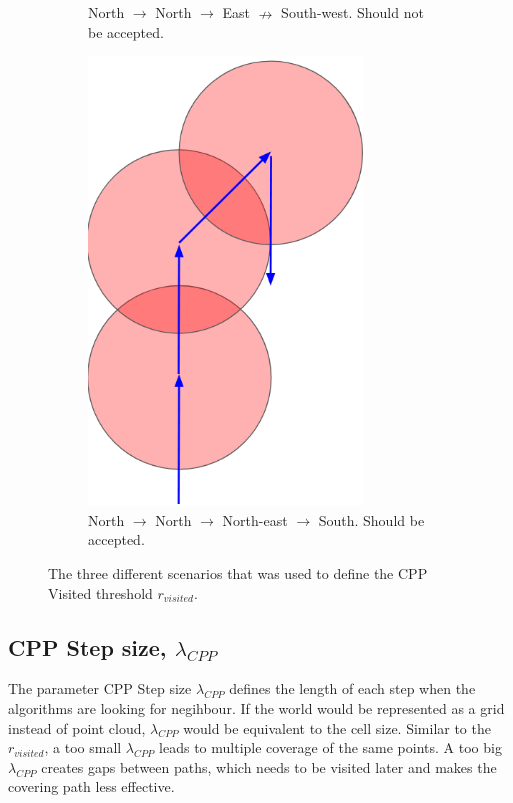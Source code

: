 \begin{figure}
\begin{subfigure}{0.3\textwidth}
    \caption{North $\rightarrow$ North $\rightarrow$ East $\nrightarrow$ South-west. Should not be accepted.}
    \label{fig:threshold_b}
    \end{subfigure}
    \begin{subfigure}{0.3\textwidth}
    \centering
    \includegraphics[width=0.8\textwidth]{figures/threshold_c.png}
    \caption{North $\rightarrow$ North $\rightarrow$ North-east $\rightarrow$ South. Should be accepted.}
    \label{fig:threshold_c}
    \end{subfigure}
    \caption{The three different scenarios that was used to define the CPP Visited threshold $r_{visited}$.}
    \label{fig:threshold}
\end{figure}

\subsection{CPP Step size, $\lambda_{CPP}$}
The parameter CPP Step size $\lambda_{CPP}$ defines the length of each step when the algorithms are looking for negihbour. If the world would be represented as a grid instead of point cloud, $\lambda_{CPP}$ would be equivalent to the cell size. Similar to the  $r_{visited}$, a too small $\lambda_{CPP}$ leads to multiple coverage of the same points. A too big $\lambda_{CPP}$ creates gaps between paths, which needs to be visited later and makes the covering path less effective. 


